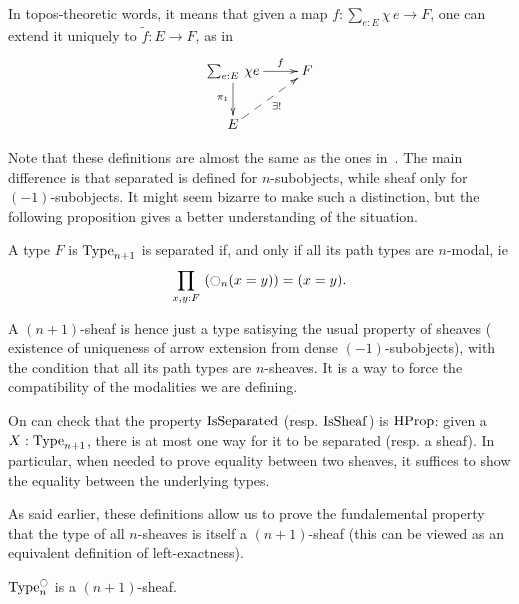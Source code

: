 In topos-theoretic words, it means that given a map $f : \sum_{e:E}
\chi\, e\to F$, one can
extend it uniquely to $\tilde f:E \to F$, as in 
 \[ \xymatrix{
    \sumD e E {\chi e} \ar[r]^-f \ar[d]_{\pi_1} & F \\
    E \ar@{-->}[ru]_{\exists !}&
  }\]

Note that these definitions are almost the same as the ones
in~\cite{maclanemoerdijk}. The main difference is that {separated}
is defined for $n$-subobjects, while {sheaf} only for
$(-1)$-subobjects. It might seem bizarre to make such a distinction,
but the following proposition gives a better understanding of the situation.
\begin{prop}
  A type $F$ is $\operatorname{Type}_{n+1}$ is separated if, and only if all its
  path types are $n$-modal, ie
  \[ \prod_{x,y:F}\, \left( \ocircle_n(x=y) \right) = (x=y).\]
\end{prop}

A $(n+1)$-sheaf is hence just a type satisying the usual property of sheaves
(\ie{} existence of uniqueness of arrow extension from dense
$(-1)$-subobjects), with the condition that all its path types are
$n$-sheaves. It is a way to force the compatibility of the modalities we
are defining.

On can check that the property $\operatorname{IsSeparated}$ (resp. $\operatorname{IsSheaf}$) is $\operatorname{HProp}$:
given a $X:\operatorname{Type}_{n+1}$, there is at most one way for it to be separated
(resp. a sheaf). In particular, when needed to prove equality between
two sheaves, it suffices to show the equality between the underlying
types.

As said earlier, these definitions allow us to prove the fundalemental
property that the type of all $n$-sheaves is itself a $(n+1)$-sheaf
(this can be viewed as an equivalent definition of left-exactness).

\begin{prop}\label{prop:sheaf-is-sheaf}
  $\operatorname{Type}_n^{\ocircle}$ is a $(n+1)$-sheaf.
\end{prop}

